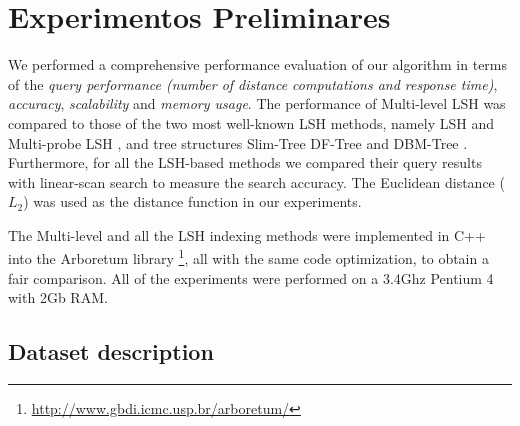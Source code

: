 \section{Experimentos Preliminares}


We performed a comprehensive performance evaluation of our algorithm in terms of the \textit{query performance (number of distance computations and response time)}, \textit{accuracy},  \textit{scalability}  and \textit{memory usage}.   The performance of Multi-level LSH was compared to those of the two most well-known LSH methods, namely LSH \cite{lsh} and Multi-probe LSH \cite{multiprobe}, and tree structures Slim-Tree \cite{SlimTree}  DF-Tree \cite{dftree} and DBM-Tree \cite{DBMTree}. Furthermore, for all the LSH-based methods we compared their query results with linear-scan search to measure the search accuracy. The Euclidean distance ($L_2$) was used as the distance function in our experiments.

The Multi-level and all the LSH indexing methods were implemented in C++ into the Arboretum library \footnote{\url{http://www.gbdi.icmc.usp.br/arboretum/}}, all with the same code optimization, to obtain a fair comparison.  All of the experiments were performed on a 3.4Ghz Pentium 4 with 2Gb RAM.

\subsection{Dataset description}

